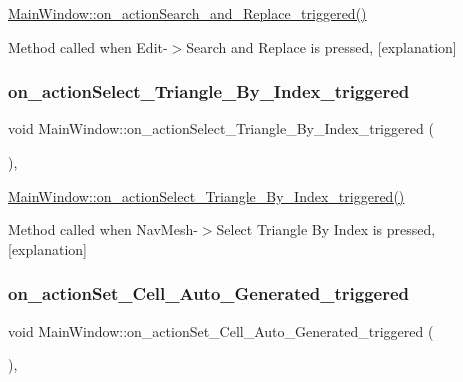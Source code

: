 \hyperlink{class_main_window_a8447eeb10a01419b396f470c0745ec01}{Main\+Window\+::on\+\_\+action\+Search\+\_\+and\+\_\+\+Replace\+\_\+triggered()} 

Method called when Edit-\/$>$Search and Replace is pressed, \mbox{[}explanation\mbox{]} \mbox{\label{class_main_window_ad60b7b6646fc2e3859d0d96337f4fe53}} 
\subsubsection{\texorpdfstring{on\+\_\+action\+Select\+\_\+\+Triangle\+\_\+\+By\+\_\+\+Index\+\_\+triggered}{on\_actionSelect\_Triangle\_By\_Index\_triggered}}
{\footnotesize\ttfamily void Main\+Window\+::on\+\_\+action\+Select\+\_\+\+Triangle\+\_\+\+By\+\_\+\+Index\+\_\+triggered (\begin{DoxyParamCaption}{ }\end{DoxyParamCaption})\hspace{0.3cm}{\ttfamily [private]}, {\ttfamily [slot]}}



\hyperlink{class_main_window_ad60b7b6646fc2e3859d0d96337f4fe53}{Main\+Window\+::on\+\_\+action\+Select\+\_\+\+Triangle\+\_\+\+By\+\_\+\+Index\+\_\+triggered()} 

Method called when Nav\+Mesh-\/$>$Select Triangle By Index is pressed, \mbox{[}explanation\mbox{]} \mbox{\label{class_main_window_ae5dd5f28e8bbe2be6d69d8b4d05b0310}} 
\subsubsection{\texorpdfstring{on\+\_\+action\+Set\+\_\+\+Cell\+\_\+\+Auto\+\_\+\+Generated\+\_\+triggered}{on\_actionSet\_Cell\_Auto\_Generated\_triggered}}
{\footnotesize\ttfamily void Main\+Window\+::on\+\_\+action\+Set\+\_\+\+Cell\+\_\+\+Auto\+\_\+\+Generated\+\_\+triggered (\begin{DoxyParamCaption}{ }\end{DoxyParamCaption})\hspace{0.3cm}{\ttfamily [private]}, {\ttfamily [slot]}}



